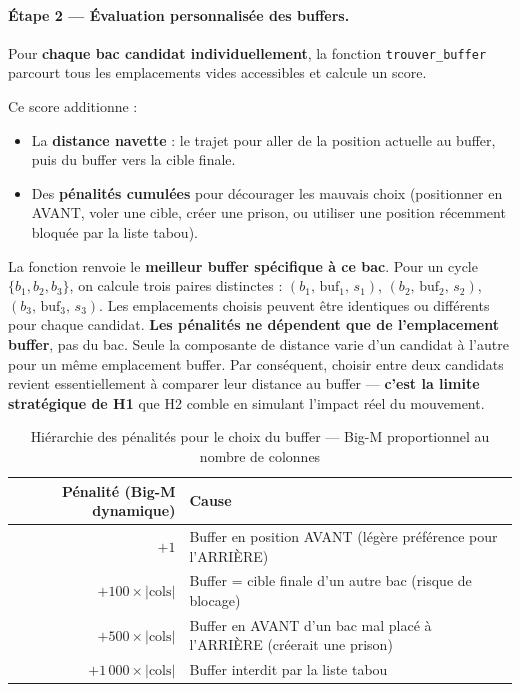 \documentclass[12pt,a4paper]{article}
\begin{document}
\paragraph{Étape 2 — Évaluation personnalisée des buffers.}
Pour \textbf{chaque bac candidat individuellement}, la fonction
\texttt{trouver\_buffer} parcourt tous les emplacements vides
accessibles et calcule un score.

Ce score additionne :
\begin{itemize}[noitemsep]
  \item La \textbf{distance navette} : le trajet pour aller de la position actuelle au buffer, puis du buffer vers la cible finale.
  \item Des \textbf{pénalités cumulées} pour décourager les mauvais choix (positionner en AVANT, voler une cible, créer une prison, ou utiliser une position récemment bloquée par la liste tabou).
\end{itemize}

\begin{tcolorbox}[colback=gris, colframe=orange, fonttitle=\bfseries, title=Mécanisme clé : buffer personnalisé par bac]
La fonction renvoie le \textbf{meilleur buffer spécifique à ce bac}.
Pour un cycle $\{b_1, b_2, b_3\}$, on calcule trois paires distinctes :
$(b_1,\, \text{buf}_1,\, s_1)$, $(b_2,\, \text{buf}_2,\, s_2)$, $(b_3,\, \text{buf}_3,\, s_3)$.
Les emplacements choisis peuvent être identiques ou différents pour chaque candidat.
\textbf{Les pénalités ne dépendent que de l'emplacement buffer}, pas du bac.
Seule la composante de distance varie d'un candidat à l'autre
pour un même emplacement buffer. Par conséquent, choisir entre deux candidats
revient essentiellement à comparer leur distance au buffer — \textbf{c'est la limite
stratégique de H1} que H2 comble en simulant l'impact réel du mouvement.
\end{tcolorbox}

\begin{table}[H]
\centering
\renewcommand{\arraystretch}{1.3}
\begin{tabular}{r l}
\toprule
Pénalité (Big-M dynamique) & Cause \\
\midrule
$+1$                         & Buffer en position AVANT (légère préférence pour l'ARRIÈRE) \\
$+100 \times |\text{cols}|$  & Buffer = cible finale d'un autre bac (risque de blocage) \\
$+500 \times |\text{cols}|$  & Buffer en AVANT d'un bac mal placé à l'ARRIÈRE (créerait une prison) \\
$+1\,000 \times |\text{cols}|$ & Buffer interdit par la liste tabou \\
\bottomrule
\end{tabular}
\caption{Hiérarchie des pénalités pour le choix du buffer — Big-M proportionnel au nombre de colonnes}
\end{table}
\end{document}
